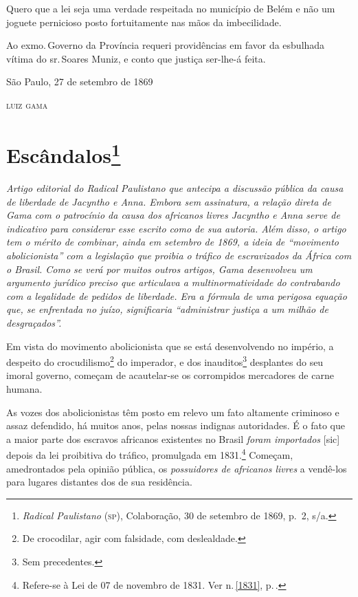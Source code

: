 Quero que a lei seja uma verdade respeitada no município de Belém e não
um joguete pernicioso posto fortuitamente nas mãos da imbecilidade.

Ao exmo.\,Governo da Província requeri providências em favor da esbulhada
vítima do sr.\,Soares Muniz, e conto que justiça ser-lhe-á feita.

\begin{flushright}
São Paulo, 27 de setembro de 1869

\textsc{luiz gama}
\end{flushright}

\chapter{Escândalos\footnote{\emph{Radical Paulistano} (\textsc{sp}),
  Colaboração, 30 de setembro de 1869, p.~2, s/a.}}

\begin{didascalia}\itshape
Artigo editorial do \textnormal{Radical Paulistano} que antecipa a discussão
pública da causa de liberdade de Jacyntho e Anna. Embora sem assinatura,
a relação direta de Gama com o patrocínio da causa dos africanos livres
Jacyntho e Anna serve de indicativo para considerar esse escrito como de
sua autoria. Além disso, o artigo tem o mérito de combinar, ainda em
setembro de 1869, a ideia de ``movimento abolicionista'' com a legislação
que proibia o tráfico de escravizados da África com o Brasil. Como se
verá por muitos outros artigos, Gama desenvolveu um argumento jurídico
preciso que articulava a multinormatividade do contrabando com a
legalidade de pedidos de liberdade. Era a fórmula de uma perigosa
equação que, se enfrentada no juízo, significaria ``administrar justiça a
um milhão de desgraçados''.
\end{didascalia}



Em vista do movimento abolicionista que se está desenvolvendo no
império, a despeito do crocudilismo\footnote{De crocodilar, agir com
  falsidade, com deslealdade.} do imperador, e dos inauditos\footnote{
  Sem precedentes.} desplantes do seu imoral governo, começam de
acautelar-se os corrompidos mercadores de carne humana.

As vozes dos abolicionistas têm posto em relevo um fato altamente
criminoso e assaz defendido, há muitos anos, pelas nossas indignas
autoridades. É o fato que a maior parte dos escravos africanos
existentes no Brasil \emph{foram importados} {[}sic{]} depois da lei
proibitiva do tráfico, promulgada em 1831.\footnote{Refere-se à Lei de
  07 de novembro de 1831. Ver n.\,\ref{1831}, p.\,\pageref{1831}.} Começam,
amedrontados pela opinião pública, os \emph{possuidores de africanos
livres} a vendê-los para lugares distantes dos de sua residência.

